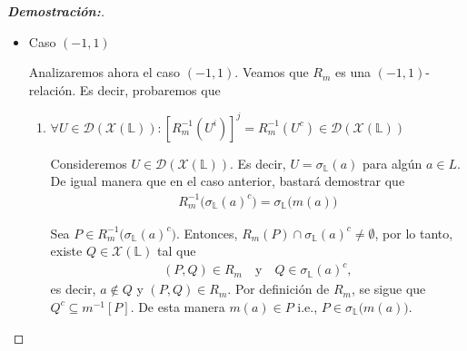 \documentclass[12pt]{book}
\begin{document}
\begin{proof}[{\textbf{Demostración:}}]
\begin{itemize}
\begin{enumerate}
\vspace{0.2cm}

\item Si $(P,Q)\notin R_m\Rightarrow \exists U\in \mathcal{D}(\mathcal{X}(\mathbb{L})): Q\in U^i = U\text{ y } R_m(P)\cap U=\emptyset$

\vspace{0.2cm}

Si $(P,Q)\notin R_m$, entonces $Q\nsubseteq m^{-1}[P]$; es decir, existe $a\in Q$ con $a\notin m^{-1}[P]$. Sea
\begin{align*}
        U=\sigma_{\mathbb{L}}(a).
\end{align*}
Claramente, $Q\in \sigma_{\mathbb{L}}(a)=U$. Supongamos, buscando una contradicción, que existe $Z\in R_m(P)\cap U$. Entonces, $Z\in \sigma_{\mathbb{L}}(a)$ implica que $a\in Z$ y, dado que $Z\subseteq m^{-1}[P]$, se obtendría $a\in m^{-1}[P]$, lo cual contradice nuestra suposición. Así, se concluye que $R_m(P)\cap U = \emptyset$.
\end{enumerate}
En consecuencia, se demuestra que $R_m$ es una $(1,1)$-relación y 
\begin{align*}
(\mathcal{X}(\mathbb{L}), \tau_L, \subseteq, R_m)
\end{align*}
es un $(1,1)$-espacio de Priestley.\\

\vspace{0.2cm}

\item Caso $(-1,1)$


Analizaremos ahora el caso $(-1,1)$. Veamos que $R_m$ es una $(-1,1)$-relación. Es decir, probaremos que
\begin{enumerate}
\item $\forall U\in \mathcal{D}(\mathcal{X}(\mathbb{L})): [R_m^{-1}(U^i)]^j = R_m^{-1}(U^c)\in \mathcal{D}(\mathcal{X}(\mathbb{L}))$

\vspace{0.2cm}


Consideremos \(U \in \mathcal{D}(\mathcal{X}(\mathbb{L}))\). Es decir, $U=\sigma_{\mathbb{L}}(a)$ para algún $a\in L$. De igual manera que en el caso anterior, bastará demostrar que
\begin{align*}
R_m^{-1}\bigl(\sigma_{\mathbb{L}}(a)^c\bigr)=\sigma_{\mathbb{L}}\bigl(m(a)\bigr)
\end{align*}

Sea \(P\in R_m^{-1}\bigl(\sigma_{\mathbb{L}}(a)^c\bigr)\). Entonces, $R_m(P)\cap \sigma_{\mathbb{L}}(a)^c\neq\emptyset$, por lo tanto, existe \(Q\in \mathcal{X}(\mathbb{L})\) tal que
\begin{align*}
    (P,Q)\in R_m \quad \text{y} \quad Q\in \sigma_{\mathbb{L}}(a)^c,
\end{align*}
es decir, \(a\notin Q\) y \((P,Q)\in R_m\). Por definición de $R_{m}$, se sigue que $Q^c\subseteq m^{-1}[P]$. De esta manera $m(a)\in P$ i.e., \(P\in \sigma_{\mathbb{L}}\bigl(m(a)\bigr)\).\\


\end{enumerate}
\end{itemize}
\end{proof}
\end{document}

